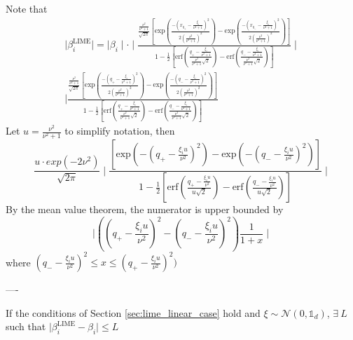         Note that 
        \begin{align*}
            \mid \beta^{\text{LIME}}_i\mid = \mid \beta_i \mid \cdot  \mid \frac{\frac{\frac{\nu^2}{\nu^2+1}}{\sqrt{2\pi}}\left[\text{exp}\left(\frac{-(x_{q_+}-\frac{\xi_i}{\nu^2+1})^2}{2(\frac{\nu^2}{\nu^2+1})^2}\right) - \text{exp}\left(\frac{-(x_{q_-}-\frac{\xi_i}{\nu^2+1})^2}{2(\frac{\nu^2}{\nu^2+1})^2}\right)\right]}{1 - \frac{1}{2}\left[\text{erf} \left( \frac{q_+-\frac{\xi_i}{\nu^2+1}}{\frac{\nu^2}{\nu^2+1}\sqrt{2}} \right) - \text{erf} \left( \frac{q_- -\frac{\xi_i}{\nu^2+1}}{\frac{\nu^2}{\nu^2+1}\sqrt{2}} \right) \right]} \mid \\
            \mid \frac{\frac{\frac{\nu^2}{\nu^2+1}}{\sqrt{2\pi}}\left[\text{exp}\left(\frac{-(q_+-\frac{\xi_i}{\nu^2+1})^2}{2(\frac{\nu^2}{\nu^2+1})^2}\right) - \text{exp}\left(\frac{-(q_- -\frac{\xi_i}{\nu^2+1})^2}{2(\frac{\nu^2}{\nu^2+1})^2}\right)\right]}{1 - \frac{1}{2}\left[\text{erf} \left( \frac{q_+-\frac{\xi_i}{\nu^2+1}}{\frac{\nu^2}{\nu^2+1}\sqrt{2}} \right) - \text{erf} \left( \frac{q_--\frac{\xi_i}{\nu^2+1}}{\frac{\nu^2}{\nu^2+1}\sqrt{2}} \right) \right]} %
        \end{align*}
        Let $u = \frac{\nu^2}{\nu^2+1}$ to simplify notation, then
        \begin{equation*}
            \frac{u\cdot exp(-2\nu^2)}{\sqrt{2\pi}}\mid \frac{\left[\text{exp}\left(-(q_+-\frac{\xi_i u}{\nu^2})^2\right) - \text{exp}\left(-(q_- -\frac{\xi_i u}{\nu^2})^2\right)\right]}{1 - \frac{1}{2}\left[\text{erf} \left( \frac{q_+-\frac{\xi_i u}{\nu^2}}{u\sqrt{2}} \right) - \text{erf} \left( \frac{q_--\frac{\xi_i u}{\nu^2}}{u\sqrt{2}} \right) \right]} \mid
        \end{equation*}
        By the mean value theorem, the numerator is upper bounded by 
        \begin{equation*}
            \mid ((q_+-\frac{\xi_i u}{\nu^2})^2 - (q_--\frac{\xi_i u}{\nu^2})^2) \frac{1}{1 + x} \mid
        \end{equation*}
        where $(q_--\frac{\xi_i u}{\nu^2})^2 \leq x \leq (q_+-\frac{\xi_i u}{\nu^2})^2)$

----
    \begin{lemma}
        If the conditions of Section \ref{sec:lime_linear_case} hold and $\xi \sim \mathcal{N}(0,\mathds{1}_d)$, $\exists\ L$ such that $\mid\beta^{\text{LIME}}_i - \beta_i\mid \leq L$
    \end{lemma}

